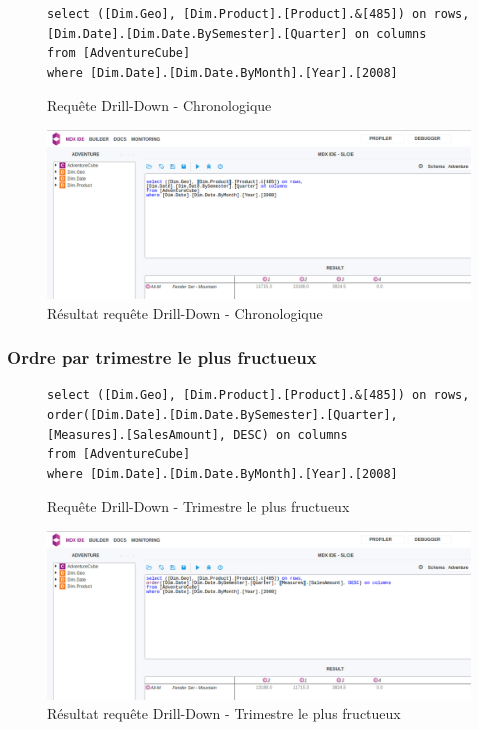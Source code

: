 \begin{figure}[H]
\centering
\begin{lstlisting}
select ([Dim.Geo], [Dim.Product].[Product].&[485]) on rows,
[Dim.Date].[Dim.Date.BySemester].[Quarter] on columns
from [AdventureCube]
where [Dim.Date].[Dim.Date.ByMonth].[Year].[2008]
\end{lstlisting}
\caption{Requête Drill-Down - Chronologique}
\label{lst:reqDrill1}
\end{figure}

\begin{figure}[H]
    \centering
    \includegraphics[width=1\linewidth, fbox]{img/requeteDrill1.png}
    \caption{Résultat requête Drill-Down - Chronologique}
    \label{reqDrill1}
\end{figure}

\subsubsection*{Ordre par trimestre le plus fructueux}

\begin{figure}[H]
\centering
\begin{lstlisting}
select ([Dim.Geo], [Dim.Product].[Product].&[485]) on rows,
order([Dim.Date].[Dim.Date.BySemester].[Quarter], [Measures].[SalesAmount], DESC) on columns
from [AdventureCube]
where [Dim.Date].[Dim.Date.ByMonth].[Year].[2008]
\end{lstlisting}
\caption{Requête Drill-Down - Trimestre le plus fructueux}
\label{lst:reqDrill2}
\end{figure}

\begin{figure}[H]
    \centering
    \includegraphics[width=1\linewidth, fbox]{img/requeteDrill2.png}
    \caption{Résultat requête Drill-Down - Trimestre le plus fructueux}
    \label{reqDrill2}
\end{figure}
